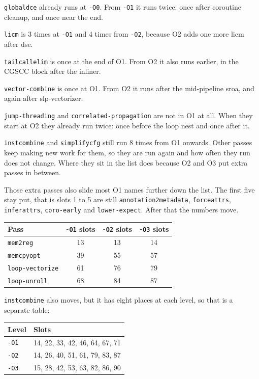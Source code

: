 \documentclass[11pt,a4paper]{article}
\begin{document}
\texttt{globaldce} already runs at \texttt{-O0}. From \texttt{-O1} it
runs twice: once after coroutine cleanup, and once near the end.

\texttt{licm} is 3 times at \texttt{-O1} and 4 times from
\texttt{-O2}, because O2 adds one more licm after dse.

\texttt{tailcallelim} is once at the end of O1. From O2 it also
runs earlier, in the CGSCC block after the inliner.

\texttt{vector-combine} is once at O1. From O2 it runs after the
mid-pipeline sroa, and again after slp-vectorizer.

\texttt{jump-threading} and \texttt{correlated-propagation} are not
in O1 at all. When they start at O2 they already run twice: once
before the loop nest and once after it.

\texttt{instcombine} and \texttt{simplifycfg} still run 8 times
from O1 onwards. Other passes keep making new work for them, so they
are run again and how often they run does not change. Where they sit
in the list does because O2 and O3 put extra passes in between.

Those extra passes also slide most O1 names further down the
list. The first five stay put, that is slots 1 to 5 are still
\texttt{annotation2metadata}, \texttt{forceattrs},
\texttt{inferattrs}, \texttt{coro-early} and
\texttt{lower-expect}. After that the numbers move. 
{\small
\begin{tabular}{lccc}
\hline
Pass & \texttt{-O1} slots & \texttt{-O2} slots & \texttt{-O3} slots \\
\hline
\texttt{mem2reg} & 13 & 13 & 14 \\
\texttt{memcpyopt} & 39 & 55 & 57 \\
\texttt{loop-vectorize} & 61 & 76 & 79 \\
\texttt{loop-unroll} & 68 & 84 & 87 \\
\hline
\end{tabular}
}

\texttt{instcombine} also moves, but it has eight places at each
level, so that is a separate table:

{\small
\begin{tabular}{ll}
\hline
Level & Slots \\
\hline
\texttt{-O1} & 14, 22, 33, 42, 46, 64, 67, 71 \\
\texttt{-O2} & 14, 26, 40, 51, 61, 79, 83, 87 \\
\texttt{-O3} & 15, 28, 42, 53, 63, 82, 86, 90 \\
\hline
\end{tabular}
}
\end{document}
